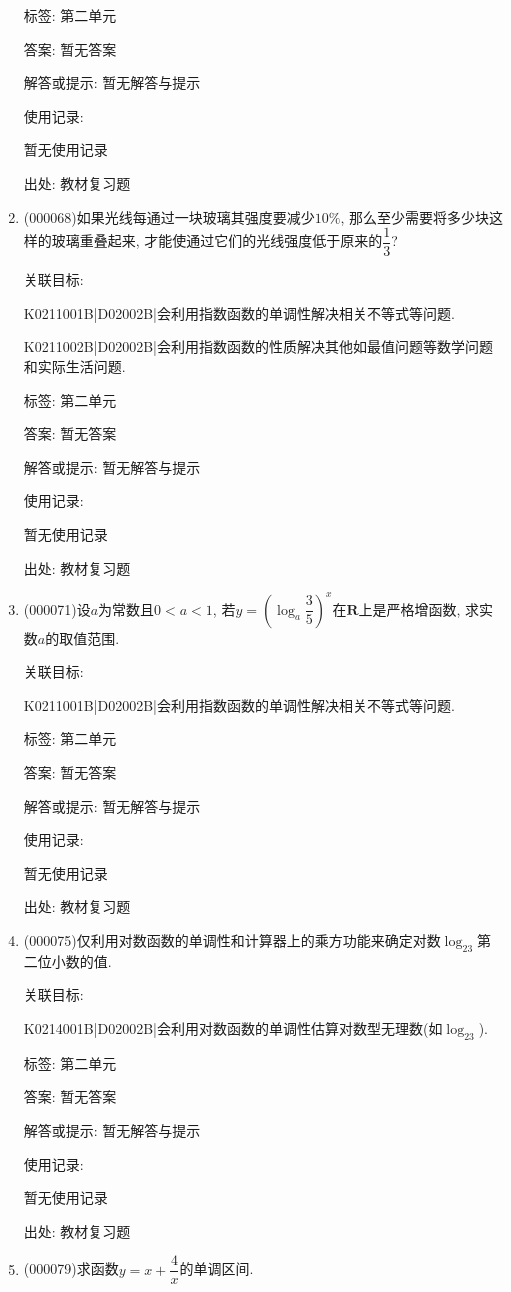 \documentclass[10pt,a4paper]{article}
\begin{document}
\begin{enumerate}[1.]
标签: 第二单元

答案: 暂无答案

解答或提示: 暂无解答与提示

使用记录:

暂无使用记录


出处: 教材复习题
\item { (000068)}如果光线每通过一块玻璃其强度要减少$10\%$, 那么至少需要将多少块这样的玻璃重叠起来, 才能使通过它们的光线强度低于原来的$\dfrac 13$?


关联目标:

K0211001B|D02002B|会利用指数函数的单调性解决相关不等式等问题.

K0211002B|D02002B|会利用指数函数的性质解决其他如最值问题等数学问题和实际生活问题.



标签: 第二单元

答案: 暂无答案

解答或提示: 暂无解答与提示

使用记录:

暂无使用记录


出处: 教材复习题
\item { (000071)}设$a$为常数且$0<a<1$, 若$y=(\log_a \dfrac 35)^x$在$\mathbf{R}$上是严格增函数, 求实数$a$的取值范围.


关联目标:

K0211001B|D02002B|会利用指数函数的单调性解决相关不等式等问题.



标签: 第二单元

答案: 暂无答案

解答或提示: 暂无解答与提示

使用记录:

暂无使用记录


出处: 教材复习题
\item { (000075)}仅利用对数函数的单调性和计算器上的乘方功能来确定对数$\log_23$第二位小数的值.


关联目标:

K0214001B|D02002B|会利用对数函数的单调性估算对数型无理数(如$\log_23$).



标签: 第二单元

答案: 暂无答案

解答或提示: 暂无解答与提示

使用记录:

暂无使用记录


出处: 教材复习题
\item { (000079)}求函数$y=x+\dfrac 4x$的单调区间.



\end{enumerate}
\end{document}
